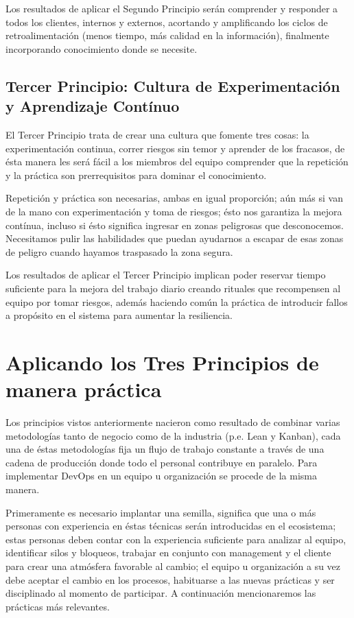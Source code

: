\documentclass[conference]{IEEEtran}
\begin{document}
Los resultados de aplicar el Segundo Principio serán comprender y responder a todos los clientes, internos y externos, acortando y amplificando los ciclos de retroalimentación (menos tiempo, más calidad en la información), finalmente incorporando conocimiento donde se necesite.

\subsection{Tercer Principio: Cultura de Experimentación y Aprendizaje Contínuo}

El Tercer Principio trata de crear una cultura que fomente tres cosas: la experimentación continua, correr riesgos sin temor y aprender de los fracasos, de ésta manera les será fácil a los miembros del equipo comprender que la repetición y la práctica son prerrequisitos para dominar el conocimiento.

Repetición y práctica son necesarias, ambas en igual proporción; aún más si van de la mano con experimentación y toma de riesgos; ésto nos garantiza la mejora contínua, incluso si ésto significa ingresar en zonas peligrosas que desconocemos. Necesitamos pulir las habilidades que puedan ayudarnos a escapar de esas zonas de peligro cuando hayamos traspasado la zona segura.

Los resultados de aplicar el Tercer Principio implican poder reservar tiempo suficiente para la mejora del trabajo diario creando rituales que recompensen al equipo por tomar riesgos, además haciendo común la práctica de introducir fallos a propósito en el sistema para aumentar la resiliencia.

\section{Aplicando los Tres Principios de manera práctica}

Los principios vistos anteriormente nacieron como resultado de combinar varias metodologías tanto de negocio como de la industria (p.e. Lean y Kanban), cada una de éstas metodologías fija un flujo de trabajo constante a través de una cadena de producción donde todo el personal contribuye en paralelo. Para implementar DevOps en un equipo u organización se procede de la misma manera. 

Primeramente es necesario implantar una semilla, significa que una o más personas con experiencia en éstas técnicas serán introducidas en el ecosistema; estas personas deben contar con la experiencia suficiente para analizar al equipo, identificar silos y bloqueos, trabajar en conjunto con management y el cliente para crear una atmósfera favorable al cambio; el equipo u organización a su vez debe aceptar el cambio en los procesos, habituarse a las nuevas prácticas y ser disciplinado al momento de participar. A continuación mencionaremos las prácticas más relevantes.
\end{document}
